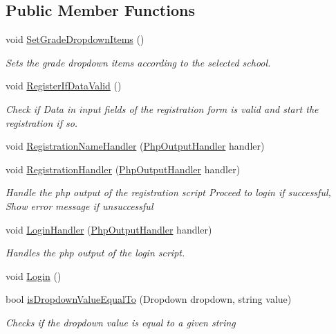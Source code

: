\subsection*{Public Member Functions}
\begin{DoxyCompactItemize}
\item 
void \hyperlink{classRegisterController_a28f855c65269510bd5dac66aa39a1f9e}{Set\+Grade\+Dropdown\+Items} ()
\begin{DoxyCompactList}\small\item\em Sets the grade dropdown items according to the selected school. \end{DoxyCompactList}\item 
void \hyperlink{classRegisterController_a27e92b0ef5a5ba595f3b6c1a51a0c0d0}{Register\+If\+Data\+Valid} ()
\begin{DoxyCompactList}\small\item\em Check if Data in input fields of the registration form is valid and start the registration if so. \end{DoxyCompactList}\item 
void \hyperlink{classRegisterController_a6134936cccf67ed5356ebe5951ca50a8}{Registration\+Name\+Handler} (\hyperlink{classPhpOutputHandler}{Php\+Output\+Handler} handler)
\item 
void \hyperlink{classRegisterController_ac6582ef5a1dfcfedb2d84d6f31ba6f31}{Registration\+Handler} (\hyperlink{classPhpOutputHandler}{Php\+Output\+Handler} handler)
\begin{DoxyCompactList}\small\item\em Handle the php output of the registration script Proceed to login if successful, Show error message if unsuccessful \end{DoxyCompactList}\item 
void \hyperlink{classRegisterController_a607fdc380924cef70152dbb79c46d4df}{Login\+Handler} (\hyperlink{classPhpOutputHandler}{Php\+Output\+Handler} handler)
\begin{DoxyCompactList}\small\item\em Handles the php output of the login script. \end{DoxyCompactList}\item 
void \hyperlink{classRegisterController_afb9a08d203a224faee4874247d51491e}{Login} ()
\item 
bool \hyperlink{classRegisterController_a35307b8660a21bbf7a186878a50c1082}{is\+Dropdown\+Value\+Equal\+To} (Dropdown dropdown, string value)
\begin{DoxyCompactList}\small\item\em Checks if the dropdown value is equal to a given string \end{DoxyCompactList}\item 

\end{DoxyCompactItemize}

